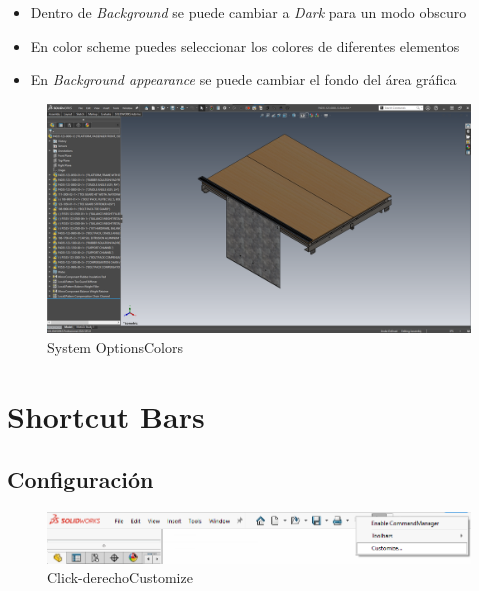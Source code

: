 \documentclass[12pt,letterpaper,final]{report}
\begin{document}
\begin{itemize}
	\item Dentro de \emph{Background} se puede cambiar a \emph{Dark} para un modo obscuro
	\item En color scheme puedes seleccionar los colores de diferentes elementos
	\item En \emph{Background appearance} se puede cambiar el fondo del área gráfica
\end{itemize}

\begin{figure}[H]
	\centering
	\includegraphics[width=0.95\linewidth, height=0.75\textheight,keepaspectratio]{Imagenes/solidworks_dark_mode02}
	\caption{System Options\textrightarrow Colors}
	\label{fig:solidworksdarkmode02}
\end{figure}


\chapter{Shortcut Bars}

\section{Configuración}

\begin{figure}[H]
	\centering
	\includegraphics[width=0.95\linewidth, height=0.5\textheight,keepaspectratio]{Imagenes/solidworks_shortcutbars_01}
	\caption{Click-derecho\textrightarrow Customize}
	\label{fig:solidworksshortcutbars01}
\end{figure}
\end{document}
